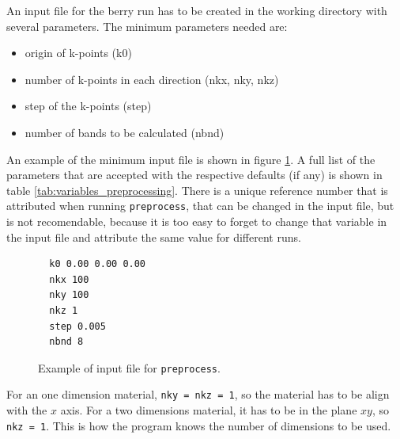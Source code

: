 \documentclass[a4paper,12pt]{report}
\begin{document}
 An input file for the berry run has to be created in the working directory with several parameters.
The minimum parameters needed are:
\begin{itemize}
 \item origin of k-points (k0)
 \item number of k-points in each direction (nkx, nky, nkz)
 \item step of the k-points (step)
 \item number of bands to be calculated (nbnd)
\end{itemize}

An example of the minimum input file is shown in figure \ref{code:inputfile}.
A full list of the parameters that are accepted with the respective defaults (if any)
is shown in table \ref{tab:variables_preprocessing}.
There is a unique reference number that is attributed when running \texttt{preprocess},
that can be changed in the input file, but is not recomendable, because it is too easy to forget
to change that variable in the input file and attribute the same value for different runs.

\begin{figure}[h]
 \centering
\begin{verbatim}
  k0 0.00 0.00 0.00
  nkx 100
  nky 100
  nkz 1
  step 0.005
  nbnd 8
\end{verbatim}
\caption{Example of input file for \texttt{preprocess}.}
\label{code:inputfile}
\end{figure}

For an one dimension material, \verb|nky = nkz = 1|, so the material has to be align with the $x$ axis.
For a two dimensions material, it has to be in the plane $xy$, so \verb|nkz = 1|.
This is how the program knows the number of dimensions to be used.
\end{document}
